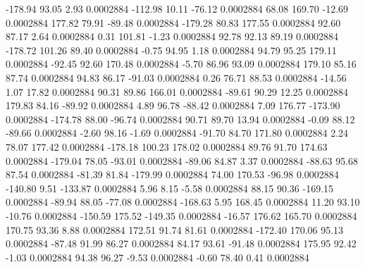      -178.94       93.05        2.93     0.0002884
     -112.98       10.11      -76.12     0.0002884
       68.08      169.70      -12.69     0.0002884
      177.82       79.91      -89.48     0.0002884
     -179.28       80.83      177.55     0.0002884
       92.60       87.17        2.64     0.0002884
        0.31      101.81       -1.23     0.0002884
       92.78       92.13       89.19     0.0002884
     -178.72      101.26       89.40     0.0002884
       -0.75       94.95        1.18     0.0002884
       94.79       95.25      179.11     0.0002884
      -92.45       92.60      170.48     0.0002884
       -5.70       86.96       93.09     0.0002884
      179.10       85.16       87.74     0.0002884
       94.83       86.17      -91.03     0.0002884
        0.26       76.71       88.53     0.0002884
      -14.56        1.07       17.82     0.0002884
       90.31       89.86      166.01     0.0002884
      -89.61       90.29       12.25     0.0002884
      179.83       84.16      -89.92     0.0002884
        4.89       96.78      -88.42     0.0002884
        7.09      176.77     -173.90     0.0002884
     -174.78       88.00      -96.74     0.0002884
       90.71       89.70       13.94     0.0002884
       -0.09       88.12      -89.66     0.0002884
       -2.60       98.16       -1.69     0.0002884
      -91.70       84.70      171.80     0.0002884
        2.24       78.07      177.42     0.0002884
     -178.18      100.23      178.02     0.0002884
       89.76       91.70      174.63     0.0002884
     -179.04       78.05      -93.01     0.0002884
      -89.06       84.87        3.37     0.0002884
      -88.63       95.68       87.54     0.0002884
      -81.39       81.84     -179.99     0.0002884
       74.00      170.53      -96.98     0.0002884
     -140.80        9.51     -133.87     0.0002884
        5.96        8.15       -5.58     0.0002884
       88.15       90.36     -169.15     0.0002884
      -89.94       88.05      -77.08     0.0002884
     -168.63        5.95      168.45     0.0002884
       11.20       93.10      -10.76     0.0002884
     -150.59      175.52     -149.35     0.0002884
      -16.57      176.62      165.70     0.0002884
      170.75       93.36        8.88     0.0002884
      172.51       91.74       81.61     0.0002884
     -172.40      170.06       95.13     0.0002884
      -87.48       91.99       86.27     0.0002884
       84.17       93.61      -91.48     0.0002884
      175.95       92.42       -1.03     0.0002884
       94.38       96.27       -9.53     0.0002884
       -0.60       78.40        0.41     0.0002884
